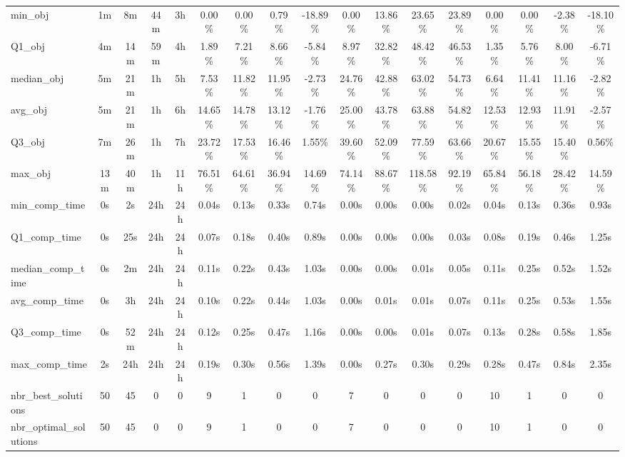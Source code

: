 \begin{tabular}{lcccccccccccccccc}
min_obj & 1m & 8m & 44m & 3h & 0.00\% & 0.00\% & 0.79\% & -18.89\% & 0.00\% & 13.86\% & 23.65\% & 23.89\% & 0.00\% & 0.00\% & -2.38\% & -18.10\% \\
Q1_obj & 4m & 14m & 59m & 4h & 1.89\% & 7.21\% & 8.66\% & -5.84\% & 8.97\% & 32.82\% & 48.42\% & 46.53\% & 1.35\% & 5.76\% & 8.00\% & -6.71\% \\
median_obj & 5m & 21m & 1h & 5h & 7.53\% & 11.82\% & 11.95\% & -2.73\% & 24.76\% & 42.88\% & 63.02\% & 54.73\% & 6.64\% & 11.41\% & 11.16\% & -2.82\% \\
avg_obj & 5m & 21m & 1h & 6h & 14.65\% & 14.78\% & 13.12\% & -1.76\% & 25.00\% & 43.78\% & 63.88\% & 54.82\% & 12.53\% & 12.93\% & 11.91\% & -2.57\% \\
Q3_obj & 7m & 26m & 1h & 7h & 23.72\% & 17.53\% & 16.46\% & 1.55\% & 39.60\% & 52.09\% & 77.59\% & 63.66\% & 20.67\% & 15.55\% & 15.40\% & 0.56\% \\
max_obj & 13m & 40m & 1h & 11h & 76.51\% & 64.61\% & 36.94\% & 14.69\% & 74.14\% & 88.67\% & 118.58\% & 92.19\% & 65.84\% & 56.18\% & 28.42\% & 14.59\% \\
min_comp_time & 0s & 2s & 24h & 24h & 0.04s & 0.13s & 0.33s & 0.74s & 0.00s & 0.00s & 0.00s & 0.02s & 0.04s & 0.13s & 0.36s & 0.93s \\
Q1_comp_time & 0s & 25s & 24h & 24h & 0.07s & 0.18s & 0.40s & 0.89s & 0.00s & 0.00s & 0.00s & 0.03s & 0.08s & 0.19s & 0.46s & 1.25s \\
median_comp_time & 0s & 2m & 24h & 24h & 0.11s & 0.22s & 0.43s & 1.03s & 0.00s & 0.00s & 0.01s & 0.05s & 0.11s & 0.25s & 0.52s & 1.52s \\
avg_comp_time & 0s & 3h & 24h & 24h & 0.10s & 0.22s & 0.44s & 1.03s & 0.00s & 0.01s & 0.01s & 0.07s & 0.11s & 0.25s & 0.53s & 1.55s \\
Q3_comp_time & 0s & 52m & 24h & 24h & 0.12s & 0.25s & 0.47s & 1.16s & 0.00s & 0.00s & 0.01s & 0.07s & 0.13s & 0.28s & 0.58s & 1.85s \\
max_comp_time & 2s & 24h & 24h & 24h & 0.19s & 0.30s & 0.56s & 1.39s & 0.00s & 0.27s & 0.30s & 0.29s & 0.28s & 0.47s & 0.84s & 2.35s \\
nbr_best_solutions & 50 & 45 & 0 & 0 & 9 & 1 & 0 & 0 & 7 & 0 & 0 & 0 & 10 & 1 & 0 & 0 \\
nbr_optimal_solutions & 50 & 45 & 0 & 0 & 9 & 1 & 0 & 0 & 7 & 0 & 0 & 0 & 10 & 1 & 0 & 0 \\
\bottomrule
\end{tabular}
